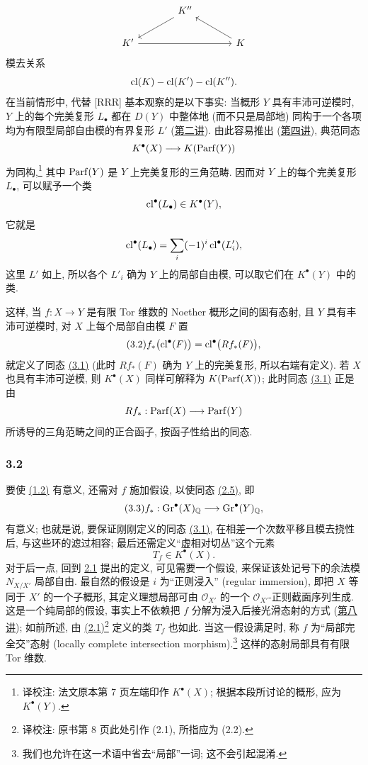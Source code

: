 \[
\begin{tikzcd}[column sep=large]
 & K'' \arrow[dl] & \\
K' \arrow[rr] && K \arrow[ul]
\end{tikzcd}
\]
模去关系
\[
\operatorname{cl}(K)-\operatorname{cl}(K')-\operatorname{cl}(K'').
\]
在当前情形中, 代替 [RRR] 基本观察的是以下事实: 当概形 $Y$ 具有丰沛可逆模时, $Y$ 上的每个完美复形 $L_\bullet$ 都在 $D(Y)$ 中整体地 (而不只是局部地) 同构于一个各项均为有限型局部自由模的有界复形 $L'$ (\hyperlink{sga6.e02.expose}{第二讲}). 由此容易推出 (\hyperlink{sga6.e04.expose}{第四讲}), 典范同态
\[
K^\bullet(X)\longrightarrow K(\operatorname{Parf}(Y))
\]
为同构,\footnote{译校注: 法文原本第 7 页左端印作 $K^\bullet(X)$; 根据本段所讨论的概形, 应为 $K^\bullet(Y)$.} 其中 $\operatorname{Parf}(Y)$ 是 $Y$ 上完美复形的三角范畴. 因而对 $Y$ 上的每个完美复形 $L_\bullet$, 可以赋予一个类
\[
\operatorname{cl}^\bullet(L_\bullet)\in K^\bullet(Y),
\]
它就是
\[
\operatorname{cl}^\bullet(L_\bullet)=\sum_i(-1)^i\operatorname{cl}^\bullet(L'_i),
\]
这里 $L'$ 如上, 所以各个 $L'_i$ 确为 $Y$ 上的局部自由模, 可以取它们在 $K^\bullet(Y)$ 中的类.

这样, 当 $f:X\to Y$ 是有限 Tor 维数的 Noether 概形之间的固有态射, 且 $Y$ 具有丰沛可逆模时, 对 $X$ 上每个局部自由模 $F$ 置
\begin{equation}\tag{3.2}
f_*\bigl(\operatorname{cl}^\bullet(F)\bigr)=\operatorname{cl}^\bullet\bigl(Rf_*(F)\bigr),
\end{equation}
就定义了同态 \hyperlink{sga6.e00.eq.3-1}{(3.1)} (此时 $Rf_*(F)$ 确为 $Y$ 上的完美复形, 所以右端有定义). 若 $X$ 也具有丰沛可逆模, 则 $K^\bullet(X)$ 同样可解释为 $K(\operatorname{Parf}(X))$; 此时同态 \hyperlink{sga6.e00.eq.3-1}{(3.1)} 正是由
\[
Rf_*:\operatorname{Parf}(X)\longrightarrow\operatorname{Parf}(Y)
\]
所诱导的三角范畴之间的正合函子, 按函子性给出的同态.

\subsubsection*{3.2}
要使 \hyperlink{sga6.e00.eq.1-2}{(1.2)} 有意义, 还需对 $f$ 施加假设, 以使同态 \hyperlink{sga6.e00.eq.2-5}{(2.5)}, 即
\begin{equation}\tag{3.3}
f_*:\operatorname{Gr}^\bullet(X)_{\mathbb Q}\longrightarrow\operatorname{Gr}^\bullet(Y)_{\mathbb Q},
\end{equation}
有意义; 也就是说, 要保证刚刚定义的同态 \hyperlink{sga6.e00.eq.3-1}{(3.1)}, 在相差一个次数平移且模去挠性后, 与这些环的滤过相容; 最后还需定义“虚相对切丛”这个元素
\[
T_f\in K^\bullet(X).
\]
对于后一点, 回到 \hyperlink{sga6.e00.sec.2.1}{2.1} 提出的定义, 可见需要一个假设, 来保证该处记号下的余法模 $N_{X/X'}$ 局部自由. 最自然的假设是 $i$ 为“正则浸入” (regular immersion), 即把 $X$ 等同于 $X'$ 的一个子概形, 其定义理想局部可由 $\mathcal O_{X'}$ 的一个 $\mathcal O_{X'}$-正则截面序列生成. 这是一个纯局部的假设, 事实上不依赖把 $f$ 分解为浸入后接光滑态射的方式 (\hyperlink{sga6.e08.expose}{第八讲}); 如前所述, 由 \hyperlink{sga6.e00.eq.2-1}{(2.1)}\footnote{译校注: 原书第 8 页此处引作 (2.1), 所指应为 (2.2).} 定义的类 $T_f$ 也如此. 当这一假设满足时, 称 $f$ 为“局部完全交”态射 (locally complete intersection morphism).\footnote{我们也允许在这一术语中省去“局部”一词; 这不会引起混淆.} 这样的态射局部具有有限 Tor 维数.

